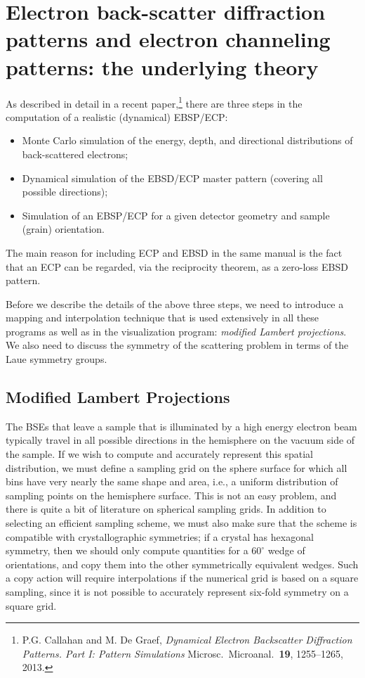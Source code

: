 \documentclass[DIV=calc, paper=letter, fontsize=11pt]{scrartcl}	 %
\begin{document}
\section{Electron back-scatter diffraction patterns and electron channeling patterns: the underlying theory\label{sec:theory}}
As described in detail in a recent paper,\footnote{P.G. Callahan and M. De Graef, \textit{Dynamical Electron Backscatter Diffraction Patterns. Part I: Pattern Simulations}
Microsc.\ Microanal.\ \textbf{19}, 1255--1265, 2013.} there are three steps in the computation of a realistic (dynamical) EBSP/ECP:
\begin{itemize}
	\item Monte Carlo simulation of the energy, depth, and directional distributions of back-scattered electrons;
	\item Dynamical simulation of the EBSD/ECP master pattern (covering all possible directions);
	\item Simulation of an EBSP/ECP for a given detector geometry and sample (grain) orientation.
\end{itemize}
The main reason for including ECP and EBSD in the same manual is the fact that an ECP can be regarded, via the reciprocity theorem, as a zero-loss EBSD pattern.

Before we describe the details of the above three steps, we need to introduce a mapping and interpolation technique that is used extensively in all
these programs as well as in the visualization program: \textit{modified Lambert projections}.  We also need to discuss the 
symmetry of the scattering problem in terms of the Laue symmetry groups. 

\subsection{Modified Lambert Projections \label{sec:Lambert}}
The BSEs that leave a sample that is illuminated by a high energy electron beam typically travel in all possible directions in the hemisphere
on the vacuum side of the sample.  If we wish to compute and accurately represent this spatial distribution, we must define a sampling grid 
on the sphere surface for which all bins have very nearly the same shape and area, i.e., a uniform distribution of sampling points 
on the hemisphere surface.  This is not an easy problem, and there is quite a bit of literature on spherical sampling grids.  In addition 
to selecting an efficient sampling scheme, we must also make sure that the scheme is compatible with crystallographic symmetries; if a crystal
has hexagonal symmetry, then we should only compute quantities for a $60^{\circ}$ wedge of orientations, and copy them into the other symmetrically
equivalent wedges.  Such a copy action will require interpolations if the numerical grid is based on a square sampling, since it is not possible
to accurately represent six-fold symmetry on a square grid.  
\end{document}
